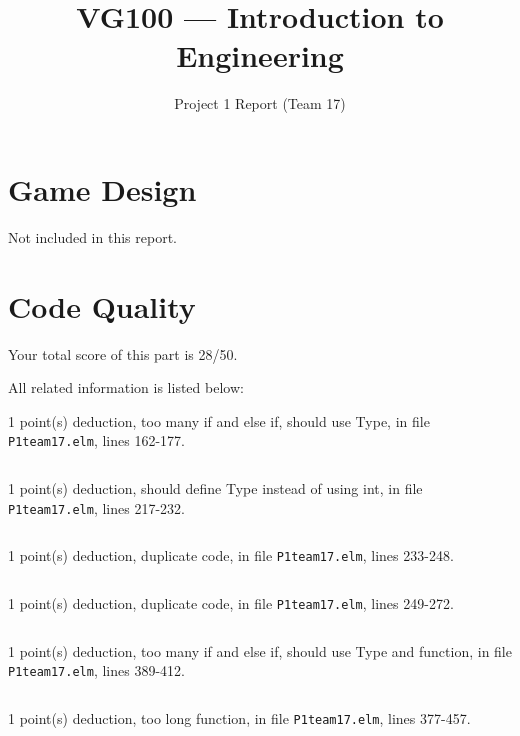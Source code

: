\documentclass{article}
\title{VG100 --- Introduction to\\ Engineering}
\subtitle{Project 1 Report (Team 17)}
\begin{document}
\maketitle

\section{Game Design}

Not included in this report.

\section{Code Quality}

Your total score of this part is 28/50. \medskip

All related information is listed below: \medskip

1 point(s) {\color{red}deduction}, too many if and else if, should use Type, in file {\color{blue}\texttt{P1team17.elm}}, lines {\color{blue}162-177}.

\inputminted[firstline=162,lastline=177]{elm}{P1team17.elm}

1 point(s) {\color{red}deduction}, should define Type instead of using int, in file {\color{blue}\texttt{P1team17.elm}}, lines {\color{blue}217-232}.

\inputminted[firstline=217,lastline=232]{elm}{P1team17.elm}

1 point(s) {\color{red}deduction}, duplicate code, in file {\color{blue}\texttt{P1team17.elm}}, lines {\color{blue}233-248}.

\inputminted[firstline=233,lastline=248]{elm}{P1team17.elm}

1 point(s) {\color{red}deduction}, duplicate code, in file {\color{blue}\texttt{P1team17.elm}}, lines {\color{blue}249-272}.

\inputminted[firstline=249,lastline=272]{elm}{P1team17.elm}

1 point(s) {\color{red}deduction}, too many if and else if, should use Type and function, in file {\color{blue}\texttt{P1team17.elm}}, lines {\color{blue}389-412}.

\inputminted[firstline=389,lastline=412]{elm}{P1team17.elm}

1 point(s) {\color{red}deduction}, too long function, in file {\color{blue}\texttt{P1team17.elm}}, lines {\color{blue}377-457}.

\inputminted[firstline=377,lastline=386]{elm}{P1team17.elm}
\end{document}

